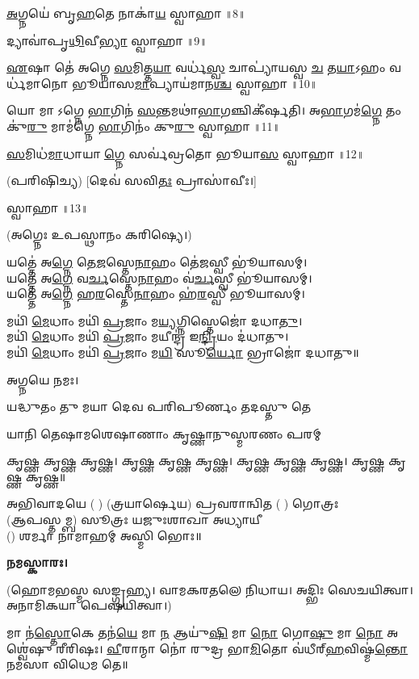 \ul{𑌅}𑌗𑍍𑌨𑌯𑍇॑ 𑌬𑍃\ul{𑌹}𑌤𑍇 𑌨𑌾𑌕𑌾॑\ul{𑌯} 𑌸𑍍𑌵𑌾𑌹𑌾॥8॥

𑌦𑍍𑌯𑌾𑌵𑌾॑𑌪𑍃\ul{𑌥𑌿}𑌵𑍀\ul{𑌭𑍍𑌯𑌾}\ul{} 𑌸𑍍𑌵𑌾𑌹𑌾॥9॥

\ul{𑌏}𑌷𑌾 𑌤𑍇॑ 𑌅𑌗𑍍𑌨𑍇 \ul{𑌸}𑌮𑌿𑌤𑍍𑌤\ul{𑌯𑌾} 𑌵𑌰𑍍𑌧॑\ul{𑌸𑍍𑌵} 𑌚𑌾𑌪𑍍𑌯𑌾॑𑌯𑌸𑍍𑌵 \ul{𑌚} 𑌤\ul{𑌯𑌾}𑌽𑌹𑌂 𑌵𑌰𑍍𑌧॑𑌮𑌾𑌨𑍋 𑌭𑍂𑌯𑌾𑌸\ul{𑌮𑌾}𑌪𑍍𑌯𑌾𑌯॑𑌮𑌾𑌨\ul{𑌶𑍍𑌚} 𑌸𑍍𑌵𑌾𑌹𑌾॥10॥

𑌯𑍋 𑌮𑌾𑌽𑌗𑍍𑌨𑍇 \ul{𑌭𑌾}𑌗𑌿𑌨॑ \ul{𑌸}𑌨𑍍𑌤𑌮𑌥𑌾॑\ul{𑌭𑌾}𑌗𑌞𑍍𑌚𑌿𑌕𑍀॑𑌰𑍍\mbox{}𑌷𑌤𑌿। 𑌅\ul{𑌭𑌾}𑌗𑌮॑\ul{𑌗𑍍𑌨𑍇} 𑌤𑌂 𑌕𑍁॑\ul{𑌰𑍁} 𑌮𑌾𑌮॑𑌗𑍍𑌨𑍇 \ul{𑌭𑌾}𑌗𑌿𑌨𑌂॑ 𑌕𑍁\ul{𑌰𑍁} 𑌸𑍍𑌵𑌾𑌹𑌾॥11॥

\ul{𑌸}𑌮𑌿𑌧॑\ul{𑌮𑌾}𑌧𑌾𑌯𑌾\ul{𑌗𑍍𑌨𑍇} 𑌸𑌰𑍍𑌵॑𑌵𑍍𑌰𑌤𑍋 𑌭𑍂𑌯𑌾\ul{𑌸}\ul{} 𑌸𑍍𑌵𑌾𑌹𑌾॥12॥

(𑌪𑌰𑌿𑌷𑌿𑌚𑍍𑌯) [𑌦𑍇𑌵॑ 𑌸𑌵𑌿\ul{𑌤𑌃} 𑌪𑍍𑌰𑌾𑌸𑌾॑𑌵𑍀𑌃।]

𑌸𑍍𑌵𑌾𑌹𑌾॥13॥


(𑌅𑌗𑍍𑌨𑍇𑌃 𑌉𑌪𑌸𑍍𑌥𑌾𑌨𑌂 𑌕𑌰𑌿𑌷𑍍𑌯𑍇।)

𑌯𑌤𑍍𑌤𑍇॑ 𑌅\ul{𑌗𑍍𑌨𑍇} 𑌤𑍇\ul{𑌜}𑌸𑍍𑌤𑍇\ul{𑌨𑌾}𑌹𑌂 𑌤𑍇॑\ul{𑌜}𑌸𑍍𑌵𑍀 𑌭𑍂॑𑌯𑌾𑌸𑌮𑍍।\\
𑌯𑌤𑍍𑌤𑍇॑ 𑌅\ul{𑌗𑍍𑌨𑍇} 𑌵\ul{𑌰𑍍𑌚}𑌸𑍍𑌤𑍇\ul{𑌨𑌾}𑌹𑌂 𑌵॑\ul{𑌰𑍍𑌚}𑌸𑍍𑌵𑍀 𑌭𑍂॑𑌯𑌾𑌸𑌮𑍍।\\
𑌯𑌤𑍍𑌤𑍇॑ 𑌅\ul{𑌗𑍍𑌨𑍇} 𑌹\ul{𑌰}𑌸𑍍𑌤𑍇\ul{𑌨𑌾}𑌹𑌂 𑌹॑\ul{𑌰}𑌸𑍍𑌵𑍀 𑌭𑍂𑌯𑌾𑌸𑌮𑍍।

𑌮𑌯𑌿॑ \ul{𑌮𑍇}𑌧𑌾𑌂 𑌮𑌯𑌿॑ \ul{𑌪𑍍𑌰}𑌜𑌾𑌂 𑌮\ul{𑌯𑍍𑌯}𑌗𑍍𑌨𑌿𑌸𑍍𑌤𑍇𑌜𑍋॑ 𑌦𑌧𑌾\ul{𑌤𑍁}।\\
𑌮𑌯𑌿॑ \ul{𑌮𑍇}𑌧𑌾𑌂 𑌮𑌯𑌿॑ \ul{𑌪𑍍𑌰}𑌜𑌾𑌂 𑌮𑌯𑍀𑌨𑍍𑌦𑍍𑌰॑ 𑌇\ul{𑌨𑍍𑌦𑍍𑌰𑌿}𑌯𑌂 𑌦॑𑌧𑌾𑌤𑍁।\\
𑌮𑌯𑌿॑ \ul{𑌮𑍇}𑌧𑌾𑌂 𑌮𑌯𑌿॑ \ul{𑌪𑍍𑌰}𑌜𑌾𑌂 𑌮\ul{𑌯𑌿} 𑌸𑍂\ul{𑌰𑍍𑌯𑍋} 𑌭𑍍𑌰𑌾𑌜𑍋॑ 𑌦𑌧𑌾𑌤𑍁॥
 
𑌅𑌗𑍍𑌨𑌯𑍇 𑌨𑌮𑌃। 

{𑌯𑌦𑍍𑌧𑍁𑌤𑌂 𑌤𑍁 𑌮𑌯𑌾 𑌦𑍇𑌵 𑌪𑌰𑌿𑌪𑍂𑌰𑍍𑌣𑌂 𑌤𑌦𑌸𑍍𑌤𑍁 𑌤𑍇}

{𑌯𑌾𑌨𑌿 𑌤𑍇𑌷𑌾𑌮𑌶𑍇𑌷𑌾𑌣𑌾𑌂 𑌕𑍃𑌷𑍍𑌣𑌾𑌨𑍁𑌸𑍍𑌮𑌰𑌣𑌂 𑌪𑌰𑌮𑍍}

𑌕𑍃𑌷𑍍𑌣 𑌕𑍃𑌷𑍍𑌣 𑌕𑍃𑌷𑍍𑌣। 𑌕𑍃𑌷𑍍𑌣 𑌕𑍃𑌷𑍍𑌣 𑌕𑍃𑌷𑍍𑌣। 𑌕𑍃𑌷𑍍𑌣 𑌕𑍃𑌷𑍍𑌣 𑌕𑍃𑌷𑍍𑌣। 𑌕𑍃𑌷𑍍𑌣 𑌕𑍃𑌷𑍍𑌣 𑌕𑍃𑌷𑍍𑌣॥

𑌅𑌭𑌿𑌵𑌾𑌦𑌯𑍇 ( ) (𑌤𑍍𑌰𑌯𑌾𑌰𑍍𑌷𑍇𑌯) 𑌪𑍍𑌰𑌵𑌰𑌾𑌨𑍍𑌵𑌿𑌤 ( ) 𑌗𑍋𑌤𑍍𑌰𑌃\\
(𑌆𑌪𑌸𑍍𑌤𑌮𑍍𑌬) 𑌸𑍂𑌤𑍍𑌰𑌃 𑌯𑌜𑍁𑌃𑌶𑌾𑌖𑌾 𑌅𑌧𑍍𑌯𑌾𑌯𑍀\\
() 𑌶𑌰𑍍𑌮𑌾 𑌨𑌾𑌮𑌾𑌹𑌮𑍍 𑌅𑌸𑍍𑌮𑌿 𑌭𑍋𑌃॥

\textbf{𑌨𑌮𑌸𑍍𑌕𑌾𑌰𑌃।}



(𑌹𑍋𑌮𑌭𑌸𑍍𑌮 𑌸𑌙𑍍𑌗𑍃𑌹𑍍𑌯। 𑌵𑌾𑌮𑌕𑌰𑌤𑌲𑍇 𑌨𑌿𑌧𑌾𑌯। 𑌅𑌦𑍍𑌭𑌿𑌃 𑌸𑍇𑌚𑌯𑌿𑌤𑍍𑌵𑌾। 𑌅𑌨𑌾𑌮𑌿𑌕𑌯𑌾 𑌪𑍇𑌷𑌯𑌿𑌤𑍍𑌵𑌾।)

 𑌮𑌾 𑌨॑\ul{𑌸𑍍𑌤𑍋}𑌕𑍇 𑌤𑌨॑\ul{𑌯𑍇} 𑌮𑌾 \ul{𑌨} 𑌆𑌯𑍁॑\ul{𑌷𑌿} 𑌮𑌾 \ul{𑌨𑍋} 𑌗𑍋\ul{𑌷𑍁} 𑌮𑌾 \ul{𑌨𑍋} 𑌅𑌶𑍍𑌵𑍇॑𑌷𑍁 𑌰𑍀𑌰𑌿𑌷𑌃। \ul{𑌵𑍀}𑌰𑌾𑌨𑍍𑌮𑌾 𑌨𑍋॑ 𑌰𑍁𑌦𑍍𑌰 𑌭𑌾\ul{𑌮𑌿}𑌤𑍋 𑌵॑𑌧𑍀𑌰𑍍‌\ul{𑌹}𑌵𑌿𑌷𑍍𑌮॑\ul{𑌨𑍍𑌤𑍋} 𑌨𑌮॑𑌸𑌾 𑌵𑌿𑌧𑍇𑌮 𑌤𑍇॥
 
